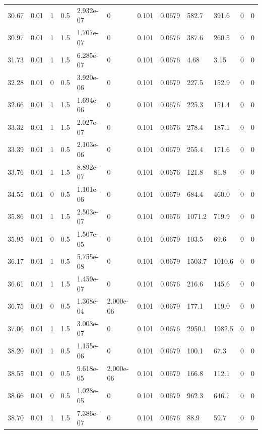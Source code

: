 \documentclass[preview]{standalone}
\begin{document}
{{{\begin{tabular}{L{1.2cm}C{1.2cm} C{0.3cm}C{0.5cm} C{1.4cm}C{1.4cm} C{1.4cm}C{1.4cm} C{1.6cm}C{1.6cm} C{1.6cm}C{1.6cm}}
  30.67  &  0.01  & 1     & 0.5 &  2.932e-07  & 0  &  0.101&   0.0679& 582.7 & 391.6   &  0 & 0  \\ 
  30.97  &  0.01  & 1     & 1.5 &  1.707e-07  & 0  &  0.101&   0.0676& 387.6 & 260.5   &  0 & 0  \\ 
  31.73  &  0.01  & 1     & 1.5 &  6.285e-07  & 0  &  0.101&   0.0676& 4.68 & 3.15   &  0 & 0  \\ 
  32.28  &  0.01  & 0     & 0.5 &  3.920e-06  & 0  &  0.101&   0.0679& 227.5 & 152.9   &  0 & 0  \\ 
  32.66  &  0.01  & 1     & 1.5 &  1.694e-06  & 0  &  0.101&   0.0676& 225.3 & 151.4   &  0 & 0  \\ 
  33.32  &  0.01  & 1     & 1.5 &  2.027e-07  & 0  &  0.101&   0.0676& 278.4 & 187.1   &  0 & 0  \\ 
  33.39  &  0.01  & 1     & 0.5 &  2.103e-06  & 0  &  0.101&   0.0679& 255.4 & 171.6   &  0 & 0  \\ 
  33.76  &  0.01  & 1     & 1.5 &  8.892e-07  & 0  &  0.101&   0.0676& 121.8 & 81.8   &  0 & 0  \\ 
  34.55  &  0.01  & 0     & 0.5 &  1.101e-06  & 0  &  0.101&   0.0679& 684.4 & 460.0   &  0 & 0  \\ 
  35.86  &  0.01  & 1     & 1.5 &  2.503e-07  & 0  &  0.101&   0.0676& 1071.2 & 719.9   &  0 & 0  \\ 
  35.95  &  0.01  & 0     & 0.5 &  1.507e-05  & 0  &  0.101&   0.0679& 103.5 & 69.6   &  0 & 0  \\ 
  36.17  &  0.01  & 1     & 0.5 &  5.755e-08  & 0  &  0.101&   0.0679& 1503.7 & 1010.6   &  0 & 0  \\ 
  36.61  &  0.01  & 1     & 1.5 &  1.459e-07  & 0  &  0.101&   0.0676& 216.6 & 145.6   &  0 & 0  \\ 
  36.75  &  0.01  & 0     & 0.5 &  1.368e-04  & 2.000e-06  &  0.101&   0.0679& 177.1 & 119.0   &  0 & 0  \\ 
  37.06  &  0.01  & 1     & 1.5 &  3.003e-07  & 0  &  0.101&   0.0676& 2950.1 & 1982.5   &  0 & 0  \\ 
  38.20  &  0.01  & 1     & 0.5 &  1.155e-06  & 0  &  0.101&   0.0679& 100.1 & 67.3   &  0 & 0  \\ 
  38.55  &  0.01  & 0     & 0.5 &  9.618e-05  & 2.000e-06  &  0.101&   0.0679& 166.8 & 112.1   &  0 & 0  \\ 
  38.66  &  0.01  & 0     & 0.5 &  1.028e-05  & 0  &  0.101&   0.0679& 962.3 & 646.7   &  0 & 0  \\ 
  38.70  &  0.01  & 1     & 1.5 &  7.386e-07  & 0  &  0.101&   0.0676& 88.9 & 59.7   &  0 & 0  \\ 

\end{tabular}}}}
\end{document}

